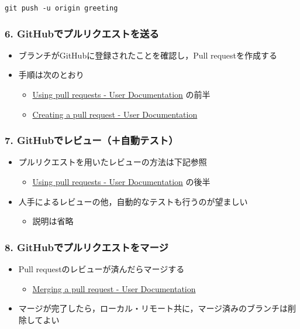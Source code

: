\documentclass[a4paper,twoside,twocolumn]{bxjsarticle}
\begin{document}
\begin{verbatim}
git push -u origin greeting
\end{verbatim}

\subsubsection{6. GitHubでプルリクエストを送る}
\label{sec-2-3-7}
\begin{itemize}
\item ブランチがGitHubに登録されたことを確認し，Pull requestを作成する
\item 手順は次のとおり
\begin{itemize}
\item \href{https://help.github.com/articles/using-pull-requests/}{Using pull requests - User Documentation} の前半
\item \href{https://help.github.com/articles/creating-a-pull-request/}{Creating a pull request - User Documentation}
\end{itemize}
\end{itemize}

\subsubsection{7. GitHubでレビュー（＋自動テスト）}
\label{sec-2-3-8}
\begin{itemize}
\item プルリクエストを用いたレビューの方法は下記参照
\begin{itemize}
\item \href{https://help.github.com/articles/using-pull-requests/}{Using pull requests - User Documentation} の後半
\end{itemize}
\item 人手によるレビューの他，自動的なテストも行うのが望ましい
\begin{itemize}
\item 説明は省略
\end{itemize}
\end{itemize}

\subsubsection{8. GitHubでプルリクエストをマージ}
\label{sec-2-3-9}
\begin{itemize}
\item Pull requestのレビューが済んだらマージする
\begin{itemize}
\item \href{https://help.github.com/articles/merging-a-pull-request/}{Merging a pull request - User Documentation}
\end{itemize}
\item マージが完了したら，ローカル・リモート共に，マージ済みのブランチは削除してよい
\end{itemize}
\end{document}
